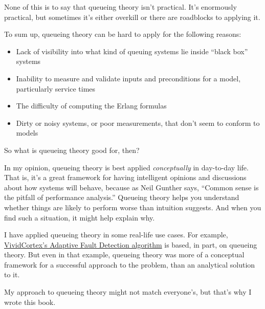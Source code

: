 \documentclass{vivid_layout_pdf}
\begin{document}
None of this is to say that queueing theory isn't practical. It's enormously practical, but sometimes it's either overkill or there are roadblocks to applying it.

To sum up, queueing theory can be hard to apply for the following reasons:

\begin{itemize}
\item Lack of visibility into what kind of queuing systems lie inside ``black box'' systems
\item Inability to measure and validate inputs and preconditions for a model, particularly service times
\item The difficulty of computing the Erlang formulas
\item Dirty or noisy systems, or poor measurements, that don't seem to conform to models
\end{itemize}

So what is queueing theory good for, then?

In my opinion, queueing theory is best applied {\itshape conceptually} in day-to-day life. That is, it's a great framework for having intelligent opinions and discussions about how systems will behave, because as Neil Gunther says, ``Common sense is the pitfall of performance analysis.'' Queueing theory helps you understand whether things are likely to perform worse than intuition suggests. And when you find such a situation, it might help explain why.

I have applied queueing theory in some real-life use cases. For example, \href{https://www.vividcortex.com/blog/2013/04/17/how-does-adaptive-fault-detection-work-does-it-really-eliminate-thresholds/}{VividCortex's Adaptive Fault Detection algorithm} is based, in part, on queueing theory. But even in that example, queueing theory was more of a conceptual framework for a successful approach to the problem, than an analytical solution to it.

My approach to queueing theory might not match everyone's, but that's why I wrote this book.
\end{document}
